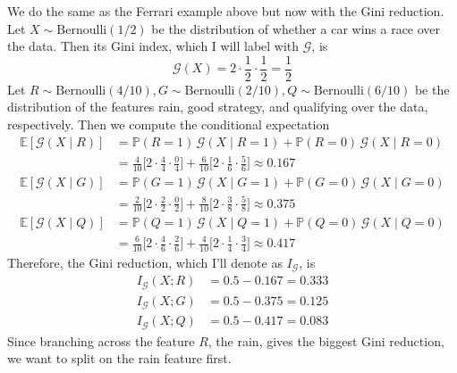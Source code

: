 \documentclass{article}
\begin{document}
    \begin{example}
      We do the same as the Ferrari example above but now with the Gini reduction. Let $X \sim \mathrm{Bernoulli}(1/2)$ be the distribution of whether a car wins a race over the data. Then its Gini index, which I will label with $\mathcal{G}$, is \[\mathcal{G} (X) = 2 \cdot \frac{1}{2} \cdot \frac{1}{2} = \frac{1}{2}\]
      Let $R \sim \mathrm{Bernoulli}(4/10), G \sim \mathrm{Bernoulli}(2/10), Q \sim \mathrm{Bernoulli}(6/10)$ be the distribution of the features rain, good strategy, and qualifying over the data, respectively. Then we compute the conditional expectation 
      \begin{align*}
          \mathbb{E}[\mathcal{G}(X \mid R)] & = \mathbb{P}(R = 1)\, \mathcal{G}(X \mid R = 1) + \mathbb{P}(R = 0) \, \mathcal{G}(X \mid R = 0) \\ 
          & = \frac{4}{10} \bigg[ 2 \cdot \frac{4}{4} \cdot \frac{0}{4} \bigg] + \frac{6}{10} \bigg[ 2 \cdot \frac{1}{6} \cdot \frac{5}{6} \bigg] \approx 0.167 \\
          \mathbb{E}[\mathcal{G}(X \mid G)] & = \mathbb{P}(G = 1)\, \mathcal{G}(X \mid G = 1) + \mathbb{P}(G = 0) \, \mathcal{G}(X \mid G = 0) \\ 
          & = \frac{2}{10} \bigg[ 2 \cdot \frac{2}{2} \cdot \frac{0}{2} \bigg] + \frac{8}{10} \bigg[ 2 \cdot \frac{3}{8} \cdot \frac{5}{8} \bigg] \approx 0.375 \\
          \mathbb{E}[\mathcal{G}(X \mid Q)] & = \mathbb{P}(Q = 1)\, \mathcal{G}(X \mid Q = 1) + \mathbb{P}(Q = 0) \, \mathcal{G}(X \mid Q = 0) \\ 
          & = \frac{6}{10} \bigg[ 2 \cdot \frac{4}{6} \cdot \frac{2}{6} \bigg] + \frac{4}{10} \bigg[ 2 \cdot \frac{1}{4} \cdot \frac{3}{4} \bigg] \approx 0.417
      \end{align*}
      Therefore, the Gini reduction, which I'll denote as $I_{\mathcal{G}}$, is 
      \begin{align*}
          I_{\mathcal{G}} (X ; R) & = 0.5 - 0.167 = 0.333 \\
          I_{\mathcal{G}} (X ; G) & = 0.5 - 0.375 = 0.125 \\
          I_{\mathcal{G}} (X ; Q) & = 0.5 - 0.417 = 0.083
      \end{align*}
      Since branching across the feature $R$, the rain, gives the biggest Gini reduction, we want to split on the rain feature first. 
    \end{example}
\end{document}
